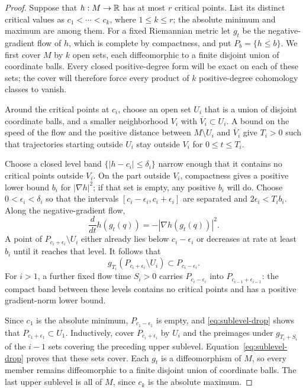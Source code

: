 \begin{proof}
Suppose that $h:M\to\mathbb R$ has at most $r$ critical points.
List its distinct critical values as $c_1<\cdots<c_k$, where $1\le k\le r$;
the absolute minimum and maximum are among them.
For a fixed Riemannian metric let $g_t$ be the negative-gradient flow
of $h$, which is complete by compactness, and put $P_b=\{h\le b\}$.
We first cover $M$ by $k$ open sets, each diffeomorphic to a finite
disjoint union of coordinate balls. Every closed positive-degree form
will be exact on each of these sets; the cover will therefore force
every product of $k$ positive-degree cohomology classes to vanish.

Around the critical points at $c_i$, choose an open set $U_i$ that is a
union of disjoint coordinate balls, and a smaller neighborhood $V_i$
with $\overline V_i\subset U_i$. A bound on the speed of the flow and
the positive distance between $M\setminus U_i$ and $\overline V_i$
give $T_i>0$ such that trajectories starting outside $U_i$ stay outside
$V_i$ for $0\le t\le T_i$.

Choose a closed level band $\{|h-c_i|\le\delta_i\}$ narrow enough that
it contains no critical points outside $V_i$. On the part outside
$V_i$, compactness gives a positive lower bound $b_i$ for
$|\nabla h|^2$; if that set is empty, any positive $b_i$ will do.
Choose $0<\epsilon_i<\delta_i$ so that the intervals
$[c_i-\epsilon_i,c_i+\epsilon_i]$ are separated and
$2\epsilon_i<T_i b_i$. Along the negative-gradient flow,
\[
 \frac{d}{dt}h(g_t(q))=-|\nabla h(g_t(q))|^2.
\]
A point of $P_{c_i+\epsilon_i}\setminus U_i$ either already lies below
$c_i-\epsilon_i$ or decreases at rate at least $b_i$ until it reaches
that level. It follows that
\begin{equation}\label{eq:sublevel-drop}
 g_{T_i}(P_{c_i+\epsilon_i}\setminus U_i)
       \subset P_{c_i-\epsilon_i}.
\end{equation}
For $i>1$, a further fixed flow time $S_i>0$ carries $P_{c_i-\epsilon_i}$
into $P_{c_{i-1}+\epsilon_{i-1}}$: the compact band between these levels
contains no critical points and has a positive gradient-norm lower bound.

Since $c_1$ is the absolute minimum, $P_{c_1-\epsilon_1}$ is empty,
and \eqref{eq:sublevel-drop} shows that $P_{c_1+\epsilon_1}\subset U_1$.
Inductively, cover $P_{c_i+\epsilon_i}$ by $U_i$ and the preimages under
$g_{T_i+S_i}$ of the $i-1$ sets covering the preceding upper sublevel.
Equation~\eqref{eq:sublevel-drop} proves that these sets cover.
Each $g_t$ is a diffeomorphism of $M$, so every member remains
diffeomorphic to a finite disjoint union of coordinate balls. The last
upper sublevel is all of $M$, since $c_k$ is the absolute maximum.


\end{proof}
